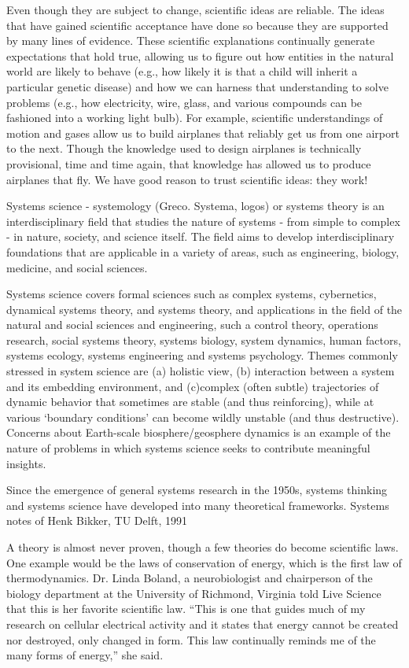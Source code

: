 Even though they are subject to change, scientific ideas are reliable. The ideas that have gained scientific acceptance have done so because they are supported by many lines of evidence. These scientific explanations continually generate expectations that hold true, allowing us to figure out how entities in the natural world are likely to behave (e.g., how likely it is that a child will inherit a particular genetic disease) and how we can harness that understanding to solve problems (e.g., how electricity, wire, glass, and various compounds can be fashioned into a working light bulb). For example, scientific understandings of motion and gases allow us to build airplanes that reliably get us from one airport to the next. Though the knowledge used to design airplanes is technically provisional, time and time again, that knowledge has allowed us to produce airplanes that fly. We have good reason to trust scientific ideas: they work!

Systems science - systemology (Greco. Systema, logos) or systems theory is an interdisciplinary field that studies the nature of systems - from simple to complex - in nature, society, and science itself. The field aims to develop interdisciplinary foundations that are applicable in a variety of areas, such as engineering, biology, medicine, and social sciences.

Systems science covers formal sciences such as complex systems, cybernetics, dynamical systems theory, and systems theory, and applications in the field of the natural and social sciences and engineering, such a control theory, operations research, social systems theory, systems biology, system dynamics, human factors, systems ecology, systems engineering and systems psychology. Themes commonly stressed in system science are (a) holistic view, (b) interaction between a system and its embedding environment, and (c)complex (often subtle) trajectories of dynamic behavior that sometimes are stable (and thus reinforcing), while at various `boundary conditions’ can become wildly unstable (and thus destructive). Concerns about Earth-scale biosphere/geosphere dynamics is an example of the nature of problems in which systems science seeks to contribute meaningful insights.

Since the emergence of general systems research in the 1950s, systems thinking and systems science have developed into many theoretical frameworks.
Systems notes of Henk Bikker, TU Delft, 1991

A theory is almost never proven, though a few theories do become scientific laws. One example would be the laws of conservation of energy, which is the first law of thermodynamics. Dr. Linda Boland, a neurobiologist and chairperson of the biology department at the University of Richmond, Virginia told Live Science that this is her favorite scientific law. ``This is one that guides much of my research on cellular electrical activity and it states that energy cannot be created nor destroyed, only changed in form. This law continually reminds me of the many forms of energy,'' she said.


